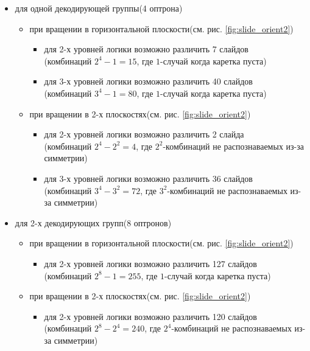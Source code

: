 \begin{itemize}
\renewcommand{\labelitemi}{$\bullet$}
\item для одной декодирующей группы(4 оптрона)
	\begin{itemize}
	\item при вращении в горизонтальной плоскости(см. рис. \ref{fig:slide_orient2})
		\begin{itemize}
			\item для 2-х уровней логики возможно различить 7 слайдов\\
			(комбинаций $2^{4}-1=15$, где $1$-случай когда каретка пуста)
			\item для 3-х уровней логики возможно различить 40 слайдов\\
			(комбинаций $3^{4}-1=80$, где $1$-случай когда каретка пуста)
		\end{itemize}
	\item при вращении в 2-х плоскостях(см. рис. \ref{fig:slide_orient2})
		\begin{itemize}
			\item для 2-х уровней логики возможно различить 2 слайда\\
			(комбинаций $2^{4}-2^{2}=4$, где $2^{2}$-комбинаций не распознаваемых из-за симметрии)
			\item для 3-х уровней логики возможно различить 36 слайдов\\
			(комбинаций $3^{4}-3^{2}=72$, где $3^{2}$-комбинаций не распознаваемых из-за симметрии)
		\end{itemize}
	\end{itemize}
\item для 2-х декодирующих групп(8 оптронов)
	\begin{itemize}
	\item при вращении в горизонтальной плоскости(см. рис. \ref{fig:slide_orient2})
		\begin{itemize}
			\item для 2-х уровней логики возможно различить 127 слайдов\\
			(комбинаций $2^{8}-1=255$, где $1$-случай когда каретка пуста)
		\end{itemize}
	\item при вращении в 2-х плоскостях(см. рис. \ref{fig:slide_orient2})
		\begin{itemize}
			\item для 2-х уровней логики возможно различить 120 слайдов\\
			(комбинаций $2^{8}-2^{4}=240$, где $2^{4}$-комбинаций не распознаваемых из-за симметрии)
		\end{itemize}
	\end{itemize}
\end{itemize}

